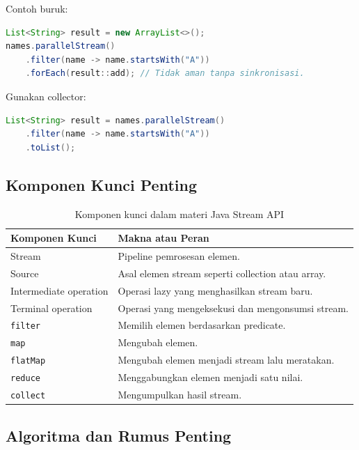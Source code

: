 Contoh buruk:

\begin{lstlisting}[language=Java, caption={Side effect buruk pada stream}, label={lst:stream-side-effect-bad}]
List<String> result = new ArrayList<>();
names.parallelStream()
    .filter(name -> name.startsWith("A"))
    .forEach(result::add); // Tidak aman tanpa sinkronisasi.
\end{lstlisting}

Gunakan collector:

\begin{lstlisting}[language=Java, caption={Menghindari side effect dengan collector}, label={lst:stream-side-effect-good}]
List<String> result = names.parallelStream()
    .filter(name -> name.startsWith("A"))
    .toList();
\end{lstlisting}

\subsection{Komponen Kunci Penting}

\begin{table}[H]
\centering
\begin{tabularx}{\textwidth}{|L{0.28\textwidth}|X|}
\hline
\textbf{Komponen Kunci} & \textbf{Makna atau Peran} \\
\hline
Stream & Pipeline pemrosesan elemen. \\
\hline
Source & Asal elemen stream seperti collection atau array. \\
\hline
Intermediate operation & Operasi lazy yang menghasilkan stream baru. \\
\hline
Terminal operation & Operasi yang mengeksekusi dan mengonsumsi stream. \\
\hline
\texttt{filter} & Memilih elemen berdasarkan predicate. \\
\hline
\texttt{map} & Mengubah elemen. \\
\hline
\texttt{flatMap} & Mengubah elemen menjadi stream lalu meratakan. \\
\hline
\texttt{reduce} & Menggabungkan elemen menjadi satu nilai. \\
\hline
\texttt{collect} & Mengumpulkan hasil stream. \\
\hline
\end{tabularx}
\caption{Komponen kunci dalam materi Java Stream API}
\label{tab:komponen-kunci-java-stream}
\end{table}

\subsection{Algoritma dan Rumus Penting}

